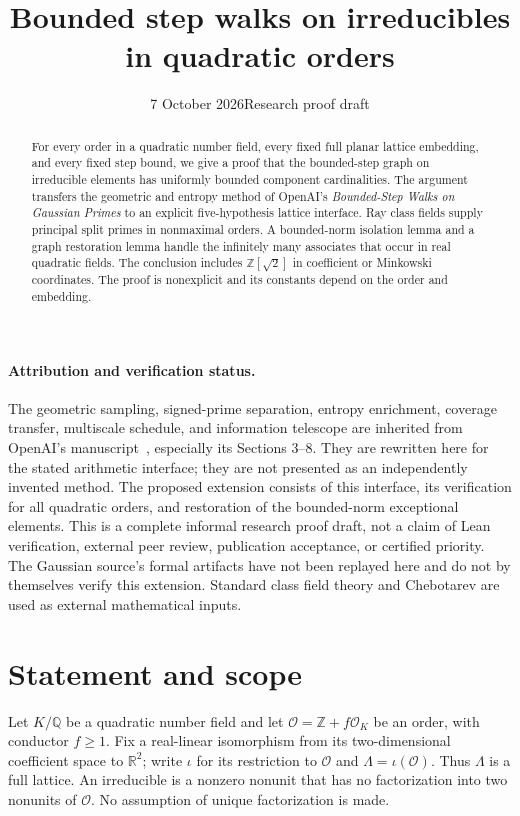 \documentclass[11pt]{article}
\title{Bounded step walks on irreducibles in quadratic orders}
\author{}
\date{7 October 2026\quad\textnormal{Research proof draft}}
\numberwithin{equation}{section}
\theoremstyle{definition}\newtheorem{definition}[theorem]{Definition}
\theoremstyle{remark}\newtheorem{remark}[theorem]{Remark}
\newcommand{\Z}{\mathbb Z}\newcommand{\Q}{\mathbb Q}\newcommand{\R}{\mathbb R}
\newcommand{\OO}{\mathcal O}\newcommand{\PP}{\mathcal P}
\begin{document}
\maketitle
\begin{abstract}
For every order in a quadratic number field, every fixed full planar lattice embedding, and every fixed step bound, we give a proof that the bounded-step graph on irreducible elements has uniformly bounded component cardinalities. The argument transfers the geometric and entropy method of OpenAI's \emph{Bounded-Step Walks on Gaussian Primes} to an explicit five-hypothesis lattice interface. Ray class fields supply principal split primes in nonmaximal orders. A bounded-norm isolation lemma and a graph restoration lemma handle the infinitely many associates that occur in real quadratic fields. The conclusion includes $\Z[\sqrt2]$ in coefficient or Minkowski coordinates. The proof is nonexplicit and its constants depend on the order and embedding.
\end{abstract}

\paragraph{Attribution and verification status.}
The geometric sampling, signed-prime separation, entropy enrichment, coverage transfer, multiscale schedule, and information telescope are inherited from OpenAI's manuscript~\cite{openai}, especially its Sections 3--8. They are rewritten here for the stated arithmetic interface; they are not presented as an independently invented method. The proposed extension consists of this interface, its verification for all quadratic orders, and restoration of the bounded-norm exceptional elements. This is a complete informal research proof draft, not a claim of Lean verification, external peer review, publication acceptance, or certified priority. The Gaussian source's formal artifacts have not been replayed here and do not by themselves verify this extension. Standard class field theory and Chebotarev are used as external mathematical inputs.

\section{Statement and scope}

Let $K/\Q$ be a quadratic number field and let $\OO=\Z+f\OO_K$ be an order, with conductor $f\ge1$. Fix a real-linear isomorphism from its two-dimensional coefficient space to $\R^2$; write $\iota$ for its restriction to $\OO$ and $\Lambda=\iota(\OO)$. Thus $\Lambda$ is a full lattice. An irreducible is a nonzero nonunit that has no factorization into two nonunits of $\OO$. No assumption of unique factorization is made.
\end{document}
